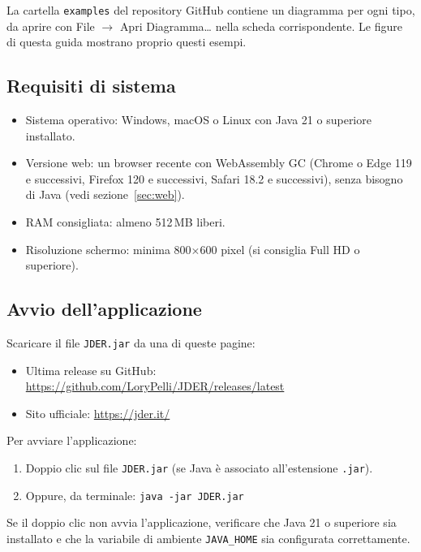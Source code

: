 \documentclass[a4paper,11pt]{article}
\newcommand\mediumweight{\fontseries{mb}\selectfont}
\newcommand\menu[1]{{\mediumweight\color{m3onprimarycontainer}#1}}
\begin{document}
\begin{tcolorbox}[tipbox, title={Diagrammi di esempio}]
  La cartella \texttt{examples} del repository GitHub contiene un diagramma per ogni tipo, da
  aprire con \menu{File} $\to$ \menu{Apri Diagramma\ldots} nella scheda corrispondente. Le figure
  di questa guida mostrano proprio questi esempi.
\end{tcolorbox}

\subsection{Requisiti di sistema}

\begin{itemize}
  \item Sistema operativo: Windows, macOS o Linux con Java 21 o superiore installato.
  \item Versione web: un browser recente con WebAssembly GC (Chrome o Edge 119 e successivi,
        Firefox 120 e successivi, Safari 18.2 e successivi), senza bisogno di Java (vedi
        sezione~\ref{sec:web}).
  \item RAM consigliata: almeno 512\,MB liberi.
  \item Risoluzione schermo: minima 800$\times$600 pixel (si consiglia Full HD o superiore).
\end{itemize}

\subsection{Avvio dell'applicazione}

Scaricare il file \texttt{JDER.jar} da una di queste pagine:
\begin{itemize}
  \item Ultima release su GitHub: \url{https://github.com/LoryPelli/JDER/releases/latest}
  \item Sito ufficiale: \url{https://jder.it/}
\end{itemize}

Per avviare l'applicazione:
\begin{enumerate}
  \item Doppio clic sul file \texttt{JDER.jar} (se Java è associato all'estensione \texttt{.jar}).
  \item Oppure, da terminale: \texttt{java -jar JDER.jar}
\end{enumerate}

\begin{tcolorbox}[warnbox, title={Attenzione}]
  Se il doppio clic non avvia l'applicazione, verificare che Java 21 o superiore sia installato
  e che la variabile di ambiente \texttt{JAVA\_HOME} sia configurata correttamente.
\end{tcolorbox}
\end{document}
